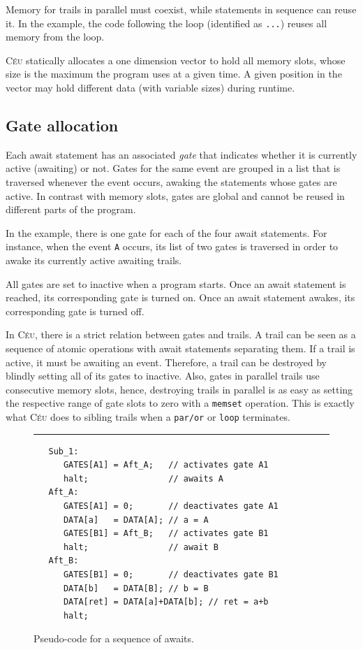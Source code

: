 \documentclass{sigplan-proc}
\newcommand{\2}{\;\;}
\newcommand{\5}{\;\;\;\;\;}
\newcommand{\CEU}{\textsc{C\'{e}u}}
\newcommand{\code}[1] {{\small{\texttt{#1}}}}
\begin{document}
Memory for trails in parallel must coexist, while statements in sequence can 
reuse it.
In the example, the code following the loop (identified as \code{...}) reuses 
all memory from the loop.

\CEU{} statically allocates a one dimension vector to hold all memory slots, 
whose size is the maximum the program uses at a given time.
A given position in the vector may hold different data (with variable sizes) 
during runtime.

\subsection{Gate allocation}
\label{sec:impl:gates}

Each await statement has an associated \emph{gate} that indicates whether it is 
currently active (awaiting) or not.
Gates for the same event are grouped in a list that is traversed whenever the 
event occurs, awaking the statements whose gates are active.
In contrast with memory slots, gates are global and cannot be reused in 
different parts of the program.

In the example, there is one gate for each of the four await statements.
For instance, when the event \code{A} occurs, its list of two gates is 
traversed in order to awake its currently active awaiting trails.

All gates are set to inactive when a program starts.
Once an await statement is reached, its corresponding gate is turned on.
Once an await statement awakes, its corresponding gate is turned off.

In \CEU, there is a strict relation between gates and trails.
A trail can be seen as a sequence of atomic operations with await statements
separating them.
If a trail is active, it must be awaiting an event.
Therefore, a trail can be destroyed by blindly setting all of its gates to 
inactive.
Also, gates in parallel trails use consecutive memory slots, hence, destroying 
trails in parallel is as easy as setting the respective range of gate slots to 
zero with a \code{memset} operation.
This is exactly what \CEU{} does to sibling trails when a \code{par/or} or 
\code{loop} terminates.

\begin{figure}[t]
\rule{8.5cm}{0.37pt}
{\small
\begin{verbatim}
   Sub_1:
      GATES[A1] = Aft_A;   // activates gate A1
      halt;                // awaits A
   Aft_A:
      GATES[A1] = 0;       // deactivates gate A1
      DATA[a]   = DATA[A]; // a = A
      GATES[B1] = Aft_B;   // activates gate B1
      halt;                // await B
   Aft_B:
      GATES[B1] = 0;       // deactivates gate B1
      DATA[b]   = DATA[B]; // b = B
      DATA[ret] = DATA[a]+DATA[b]; // ret = a+b
      halt;
\end{verbatim}
}
\caption{ Pseudo-code for a sequence of awaits.
\label{lst:impl:code:1}
}
\end{figure}
\end{document}
